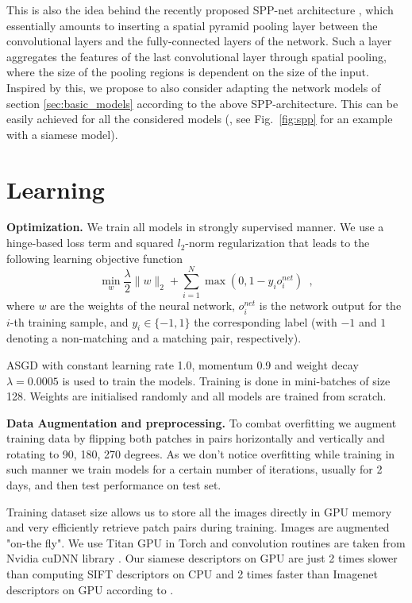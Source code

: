 \documentclass[10pt,twocolumn,letterpaper]{article}
\begin{document}
This is also the idea behind the recently proposed SPP-net architecture \cite{spp}, which essentially amounts to inserting a spatial pyramid pooling layer between the convolutional layers and  the fully-connected layers of the network. Such a layer
aggregates the features of the last convolutional layer through spatial pooling, where the size of the pooling regions is dependent on the size of the input. Inspired by this, we propose to also consider adapting the network models of section \ref{sec:basic_models} according to the above SPP-architecture. This can be easily achieved for all the considered  models (\eg, see Fig.~\ref{fig:spp} for an example with a siamese model). 


\section{Learning}

\textbf{Optimization.} We train all models in strongly supervised manner. We use  a hinge-based loss term and squared $l_2$-norm regularization that leads to the following learning objective function 
\begin{equation}\label{eq:tr_obj1}
\min_{w}\frac{\lambda}{2}\|w\|_2 + \sum_{i=1}^N\max(0, 1 - y_io^{net}_i)\enspace,
\end{equation}
where $w$ are the weights of the neural network, $o^{net}_i$ is the network output  for the $i$-th training sample, and $y_i \in \{-1,1\}$ the corresponding label (with $-1$ and $1$ denoting a non-matching and a matching  pair, respectively).

ASGD with constant learning rate 1.0, 
momentum 0.9 and weight decay $\lambda=0.0005$ is used to train the models. Training is done in 
mini-batches of size 128. Weights are initialised randomly and  all
 models are trained from scratch.

\textbf{Data Augmentation and preprocessing.} To combat overfitting we augment 
training data by flipping both patches in pairs horizontally and vertically and 
rotating to 90, 180, 270 degrees. As we don't notice overfitting while training 
in such manner we train models for a certain number of iterations, usually for 
2 days, and then test performance on test set.

Training dataset size allows us to store all the images directly in GPU memory and 
very efficiently retrieve patch pairs during training. Images are augmented 
"on-the fly". We use Titan GPU in Torch %
\cite{collobert:2011c} and
convolution routines  are taken from Nvidia cuDNN library \cite{cudnn}.
Our siamese descriptors on GPU are just 2 times slower than computing SIFT descriptors on CPU
and 2 times faster than Imagenet descriptors on GPU according to \cite{comparison}.
\end{document}
